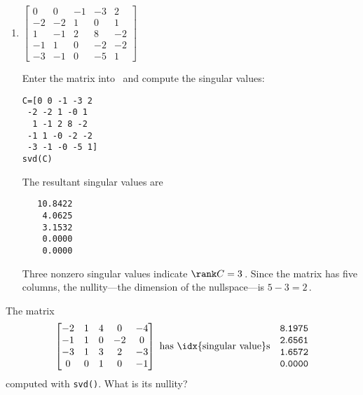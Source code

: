\begin{example}
\begin{enumerate}
\item \(\begin{bmatrix} 0&0&-1&-3&2
\\-2&-2&1&0&1
\\1&-1&2&8&-2
\\-1&1&0&-2&-2
\\-3&-1&0&-5&1 \end{bmatrix}\)
\begin{solution} 
Enter the matrix into \script\ and compute the singular values:
\begin{verbatim}
C=[0 0 -1 -3 2
 -2 -2 1 -0 1
  1 -1 2 8 -2
 -1 1 -0 -2 -2
 -3 -1 -0 -5 1]
svd(C)
\end{verbatim}
\setbox\ajrqrbox\hbox{}%
\marginajrbox%
The resultant singular values are
\begin{verbatim}
   10.8422
    4.0625
    3.1532
    0.0000
    0.0000
\end{verbatim}
Three nonzero singular values indicate \(\rank C=3\)\,.
Since the matrix has five columns, the nullity---the dimension of the nullspace---is \(5-3=2\)\,. 
\end{solution}


\end{enumerate}
\end{example}



\begin{activity}
The matrix
\begin{equation*}
\begin{bmatrix} -2&1&4&0&-4
\\-1&1&0&-2&0
\\-3&1&3&2&-3
\\0&0&1&0&-1 \end{bmatrix}
\text{ has \idx{singular value}s}\quad
\begin{matrix}\tt 8.1975
\\\tt 2.6561
\\\tt 1.6572
\\\tt 0.0000 \end{matrix}
\end{equation*}
computed with \verb|svd()|.
What is its nullity?
\end{activity}





